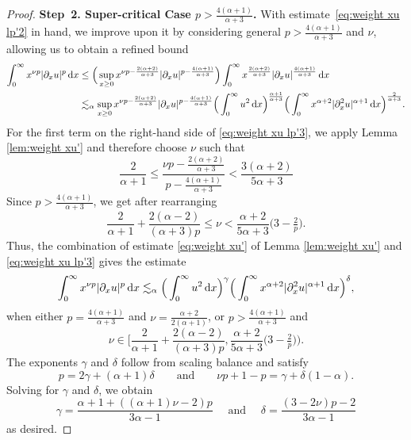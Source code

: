 \documentclass[reqno,12pt]{amsart}
\renewcommand{\d}{\ensuremath{\mathrm{d}}}
\renewcommand{\d}{\ensuremath{{\rm d}}}
\numberwithin{equation}{section}
\begin{document}
\begin{proof}
\noindent\textbf{Step~2. Super-critical Case $p > \frac{4(\alpha+1)}{\alpha+3}$.}
With estimate~\eqref{eq:weight xu lp'2} in hand, we improve upon it by considering general $p > \frac{4(\alpha+1)}{\alpha+3}$ and $\nu$, allowing us to obtain a refined bound
%
\begin{align}
\int_0^\infty x^{\nu p} |\partial_x u|^{p} \, \d x &\leq \Big(\sup_{x \ge 0} x^{\nu p -\frac{2(\alpha +2)}{\alpha+3}} |\partial_x u|^{p-\frac{4(\alpha +1)}{\alpha+3}}\Big) \int_0^\infty x^{\frac{2(\alpha +2)}{\alpha+3}} |\partial_x u|^{\frac{4(\alpha +1)}{\alpha+3}} \, \d x \nonumber \\
& \lesssim_{\alpha} \sup_{x \ge 0} x^{\nu p -\frac{2(\alpha +2)}{\alpha+3}} |\partial_x u|^{p-\frac{4(\alpha +1)}{\alpha+3}} \Big( \int_0^\infty  u^2 \, \d x \Big)^{\frac{\alpha +1}{\alpha +3}}  \Big( \int_0^\infty x^{\alpha+2}
|\partial_x^2 u|^{\alpha+1} \, \d x \Big)^{\frac{2}{\alpha+3}}. \label{eq:weight xu lp'3}
\end{align}
%
For the first term on the right-hand side of \eqref{eq:weight xu lp'3}, we apply Lemma \ref{lem:weight xu'} 
%
and therefore choose $\nu$ such that 
%
\begin{equation*}
    \frac{2}{\alpha +1} \le \frac{\nu p - \frac{2(\alpha +2)}{\alpha +3}}{p-\frac{4(\alpha +1)}{\alpha +3}} < \frac{3(\alpha +2)}{5\alpha +3}
\end{equation*}
%
Since $p > \frac{4(\alpha +1)}{\alpha +3}$, we get after rearranging 
%
\begin{equation}\label{eq:nu}
 \frac{2}{\alpha +1} + \frac{2(\alpha-2)}{(\alpha +3) p} 
 \le \nu < \frac{\alpha+2}{5\alpha+3} \big(3 - \tfrac 2 p\big) .
\end{equation}
%
Thus, the combination of estimate \eqref{eq:weight xu'} of Lemma \ref{lem:weight xu'} and \eqref{eq:weight xu lp'3} gives the estimate 
%
\begin{equation}\label{eq:weight xu lp'4}
\int_0^\infty x^{\nu p} |\partial_x u|^{p} \, \d x
\lesssim_{\alpha}  \Big( \int_0^\infty  u^2 \, \d x \Big)^{\gamma}  \Big( \int_0^\infty x^{\alpha+2}
|\partial_x^2 u|^{\alpha+1} \, \d x \Big)^{\delta},
\end{equation}
%
when either $p = \frac{4(\alpha+1)}{\alpha+3}$ and $\nu = \frac{\alpha+2}{2(\alpha+1)}$, or
%
$p>\frac{4(\alpha+1)}{\alpha+3}$ and 
%
 \begin{equation*}
\nu \in \Big[\frac{2}{\alpha +1} + \frac{2(\alpha-2)}{(\alpha +3) p}, \frac{\alpha +2}{5\alpha +3}
\big( 3-\tfrac{2}{p}\big)\Big).
\end{equation*}
%
The exponents $\gamma$ and $\delta$ follow from scaling balance and satisfy 
%
\begin{equation*}
p= 2\gamma + (\alpha +1)\delta \qquad \text{and} \qquad 
\nu p +1 -p= \gamma + \delta (1-\alpha). 
\end{equation*}
%
Solving for \(\gamma\) and \(\delta\), we obtain
%
\begin{equation*}%
\gamma = \frac{\alpha+1+((\alpha+1)\nu - 2) p}{3\alpha -1} \quad \text{ and } \quad \delta= \frac{(3-2\nu) p - 2}{3\alpha -1}
\end{equation*}
%
as desired. 
%


\end{proof}
\end{document}
